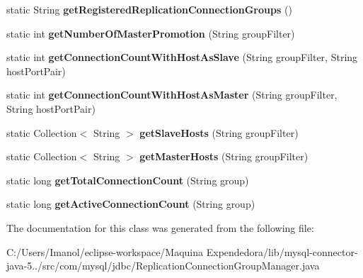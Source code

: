 \begin{DoxyCompactItemize}
static String {\bfseries get\+Registered\+Replication\+Connection\+Groups} ()
\item 
\mbox{\label{classcom_1_1mysql_1_1jdbc_1_1_replication_connection_group_manager_af46a996fc11beaefc608bf0b418b59d5}} 
static int {\bfseries get\+Number\+Of\+Master\+Promotion} (String group\+Filter)
\item 
\mbox{\label{classcom_1_1mysql_1_1jdbc_1_1_replication_connection_group_manager_a676ed79ed0029eff4e682fa703016cc8}} 
static int {\bfseries get\+Connection\+Count\+With\+Host\+As\+Slave} (String group\+Filter, String host\+Port\+Pair)
\item 
\mbox{\label{classcom_1_1mysql_1_1jdbc_1_1_replication_connection_group_manager_ab8d302eddeeb6a23b1bef90dd301f58f}} 
static int {\bfseries get\+Connection\+Count\+With\+Host\+As\+Master} (String group\+Filter, String host\+Port\+Pair)
\item 
\mbox{\label{classcom_1_1mysql_1_1jdbc_1_1_replication_connection_group_manager_a89790d5c0c930e4bd53473a5f9147ad6}} 
static Collection$<$ String $>$ {\bfseries get\+Slave\+Hosts} (String group\+Filter)
\item 
\mbox{\label{classcom_1_1mysql_1_1jdbc_1_1_replication_connection_group_manager_ae36f66328cb13aef58f675e2876b27b5}} 
static Collection$<$ String $>$ {\bfseries get\+Master\+Hosts} (String group\+Filter)
\item 
\mbox{\label{classcom_1_1mysql_1_1jdbc_1_1_replication_connection_group_manager_a057d4fb180ba959a3759248b11762e6d}} 
static long {\bfseries get\+Total\+Connection\+Count} (String group)
\item 
\mbox{\label{classcom_1_1mysql_1_1jdbc_1_1_replication_connection_group_manager_ab0e81209cbb2c3507b86cf0f80dc532f}} 
static long {\bfseries get\+Active\+Connection\+Count} (String group)
\end{DoxyCompactItemize}


The documentation for this class was generated from the following file\+:\begin{DoxyCompactItemize}
\item 
C\+:/\+Users/\+Imanol/eclipse-\/workspace/\+Maquina Expendedora/lib/mysql-\/connector-\/java-\/5../src/com/mysql/jdbc/Replication\+Connection\+Group\+Manager.\+java\end{DoxyCompactItemize}
